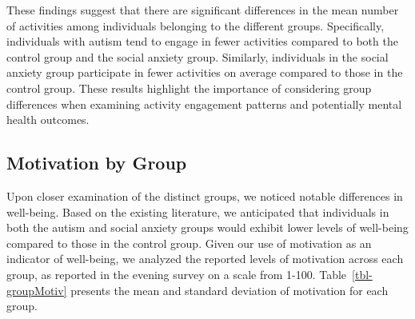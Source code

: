\documentclass[
  letterpaper,
  number,
  review,
  3p]{elsarticle}
\begin{document}
These findings suggest that there are significant differences in the
mean number of activities among individuals belonging to the different
groups. Specifically, individuals with autism tend to engage in fewer
activities compared to both the control group and the social anxiety
group. Similarly, individuals in the social anxiety group participate in
fewer activities on average compared to those in the control group.
These results highlight the importance of considering group differences
when examining activity engagement patterns and potentially mental
health outcomes.

\subsection{Motivation by Group}\label{motivation-by-group}

Upon closer examination of the distinct groups, we noticed notable
differences in well-being. Based on the existing literature, we
anticipated that individuals in both the autism and social anxiety
groups would exhibit lower levels of well-being compared to those in the
control group. Given our use of motivation as an indicator of
well-being, we analyzed the reported levels of motivation across each
group, as reported in the evening survey on a scale from 1-100.
Table~\ref{tbl-groupMotiv} presents the mean and standard deviation of
motivation for each group.

\begin{table}

\caption{\label{tbl-groupMotiv}Motivation Levels by Group}


\end{table}%
\end{document}
